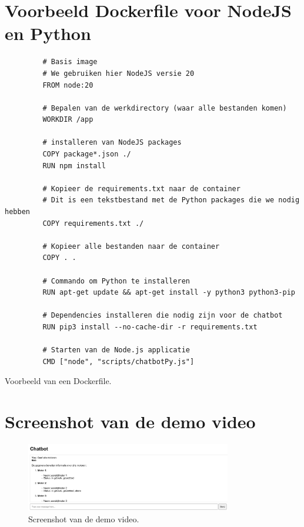 \section{Voorbeeld Dockerfile voor NodeJS en Python}
\begin{listing}[H]
    \begin{verbatim}
         # Basis image
         # We gebruiken hier NodeJS versie 20
         FROM node:20

         # Bepalen van de werkdirectory (waar alle bestanden komen)
         WORKDIR /app

         # installeren van NodeJS packages
         COPY package*.json ./
         RUN npm install

         # Kopieer de requirements.txt naar de container
         # Dit is een tekstbestand met de Python packages die we nodig hebben
         COPY requirements.txt ./

         # Kopieer alle bestanden naar de container
         COPY . .

         # Commando om Python te installeren
         RUN apt-get update && apt-get install -y python3 python3-pip

         # Dependencies installeren die nodig zijn voor de chatbot
         RUN pip3 install --no-cache-dir -r requirements.txt

         # Starten van de Node.js applicatie
         CMD ["node", "scripts/chatbotPy.js"]
    \end{verbatim}
    \caption[Voorbeeld Dockerfile]{\label{fig:dockerfile}Voorbeeld van een Dockerfile.}
\end{listing}

\section{Screenshot van de demo video}
\begin{figure}[H]
    \centering
    \includegraphics[width=0.8\textwidth]{./img/chatbot_response.png}
    \caption[Demo video (screenshot)]{\label{fig:demo}Screenshot van de demo video.}
\end{figure}

